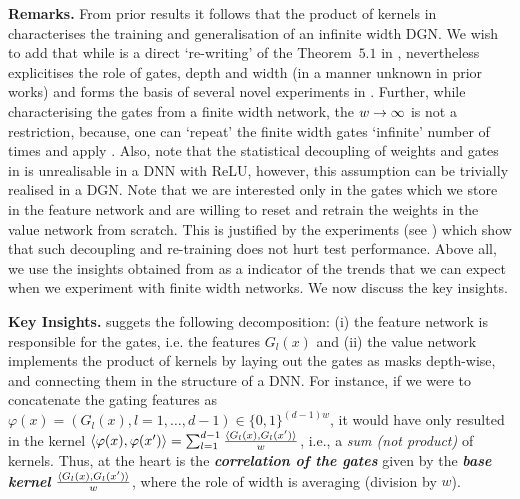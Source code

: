 \textbf{Remarks.} From prior results  it follows that the product of kernels in  characterises the training and generalisation of an infinite width DGN. We wish to add that while  is a direct `re-writing' of the Theorem~$5.1$ in ,  nevertheless  explicitises the role of gates, depth and width (in a manner unknown in prior works) and forms the basis of several novel experiments in . Further, while characterising the gates from a finite width network, the $w\rightarrow\infty$ is not a restriction, because, one can `repeat' the finite width gates `infinite' number of times and apply . Also, note that the statistical decoupling of weights and gates in  is unrealisable in a DNN with ReLU, however, this assumption can be trivially realised in a DGN. Note that we are interested only in the gates which we store in the feature network and are willing to reset and retrain the weights in the value network from scratch. This is justified by the experiments (see ) which show that such decoupling and re-training does not hurt test performance. Above all, we use the insights obtained from  as a indicator of the trends that we can expect when we experiment with finite width networks. We now discuss the key insights.

\textbf{Key Insights.}  suggets the following decomposition: (i) the feature network is responsible for the gates, i.e. the features $G_l(x)$ and (ii) the value network implements the product of kernels by laying out the gates as masks depth-wise, and connecting them in the structure of a DNN. For instance, if we were to concatenate the gating features as $\varphi(x)=(G_l(x),l=1,\ldots,d-1)\in\{0,1\}^{(d-1)w}$, it would have only resulted in the kernel $\langle \varphi(x),\varphi(x')\rangle=\sum_{l=1}^{d-1}\frac{\langle G_l(x),G_l(x')\rangle}w$, i.e., a \emph{sum  (not product)} of kernels. Thus, at the heart is the \emph{\textbf{correlation of the gates}} given by the \emph{\textbf{base kernel}} $\frac{\langle G_l(x),G_l(x')\rangle}w$, where the role of width is averaging (division by $w$). 

